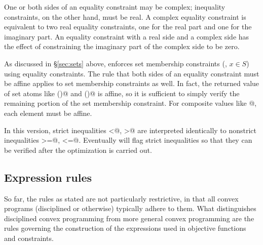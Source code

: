 \documentclass[12pt]{article}
\begin{document}
One or both sides of an equality constraint may be complex; inequality constraints,
on the other hand, must be real. A complex equality
constraint is equivalent to two real equality constraints, one for the real part
and one for the imaginary part. 
An equality constraint with
a real side and a complex side has the effect of constraining the 
imaginary part of the complex side to be zero.

As discussed in \S\ref{sec:sets} above, \cvx enforces set 
membership constraints (\eg, $x\in S$) using
equality constraints. 
The rule that both sides of an equality constraint
must be affine  applies to set membership constraints as well. 
In fact, the returned value of set atoms like 
\verb@semidefinite()@ and \verb@lorentz()@ is affine,
so it is sufficient to simply verify the remaining portion
of the set membership constraint. For composite values like
@, each element must be affine.

In this version, 
strict inequalities \verb@<@, \verb@>@ are interpreted
identically to nonstrict inequalities \verb@>=@, \verb@<=@. 
Eventually \cvx will flag strict inequalities so that they 
can be verified after the optimization is carried out.

\subsection{Expression rules}
\label{sec:noproduct}

So far, the rules as stated are not particularly restrictive, 
in that all convex programs (disciplined or otherwise) 
typically adhere to them.
What distinguishes disciplined convex programming from more general
convex programming are the rules governing
the construction of the expressions used in objective functions and
constraints.
\end{document}
